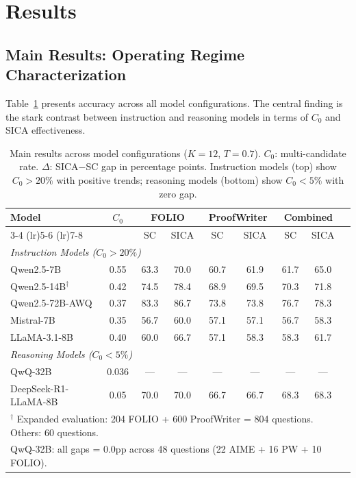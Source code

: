 \documentclass[11pt]{article}
\begin{document}
\section{Results}

\subsection{Main Results: Operating Regime Characterization}

Table~\ref{tab:main} presents accuracy across all model configurations. The central finding is the stark contrast between instruction and reasoning models in terms of $C_0$ and SICA effectiveness.

\begin{table}[t]
\centering
\caption{Main results across model configurations ($K=12$, $T=0.7$). $C_0$: multi-candidate rate. $\Delta$: SICA$-$SC gap in percentage points. Instruction models (top) show $C_0 > 20\%$ with positive trends; reasoning models (bottom) show $C_0 < 5\%$ with zero gap.}
\label{tab:main}
\small
\begin{tabular}{@{}lcccccccc@{}}
\toprule
\multirow{2}{*}{Model} & \multirow{2}{*}{$C_0$} & \multicolumn{2}{c}{FOLIO} & \multicolumn{2}{c}{ProofWriter} & \multicolumn{2}{c}{Combined} \\
\cmidrule(lr){3-4} \cmidrule(lr){5-6} \cmidrule(lr){7-8}
 & & SC & SICA & SC & SICA & SC & SICA \\
\midrule
\multicolumn{8}{l}{\textit{Instruction Models ($C_0 > 20\%$)}} \\
\midrule
Qwen2.5-7B & 0.55 & 63.3 & 70.0 & 60.7 & 61.9 & 61.7 & 65.0 \\
Qwen2.5-14B$^\dagger$ & 0.42 & 74.5 & 78.4 & 68.9 & 69.5 & 70.3 & 71.8 \\
Qwen2.5-72B-AWQ & 0.37 & 83.3 & 86.7 & 73.8 & 73.8 & 76.7 & 78.3 \\
Mistral-7B & 0.35 & 56.7 & 60.0 & 57.1 & 57.1 & 56.7 & 58.3 \\
LLaMA-3.1-8B & 0.40 & 60.0 & 66.7 & 57.1 & 58.3 & 58.3 & 61.7 \\
\midrule
\multicolumn{8}{l}{\textit{Reasoning Models ($C_0 < 5\%$)}} \\
\midrule
QwQ-32B & 0.036 & --- & --- & --- & --- & --- & --- \\
DeepSeek-R1-LLaMA-8B & 0.05 & 70.0 & 70.0 & 66.7 & 66.7 & 68.3 & 68.3 \\
\bottomrule
\multicolumn{8}{l}{\footnotesize $^\dagger$ Expanded evaluation: 204 FOLIO + 600 ProofWriter = 804 questions. Others: 60 questions.} \\
\multicolumn{8}{l}{\footnotesize QwQ-32B: all gaps = 0.0pp across 48 questions (22 AIME + 16 PW + 10 FOLIO).} \\
\end{tabular}
\end{table}
\end{document}
